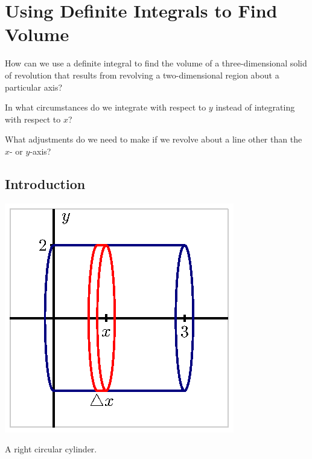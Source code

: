 \section{Using Definite Integrals to Find Volume} \label{S:6.1.Volume}

\begin{goals}
\item How can we use a definite integral to find the volume of a three-dimensional solid of revolution that results from revolving a two-dimensional region about a particular axis?
\item In what circumstances do we integrate with respect to $y$ instead of integrating with respect to $x$?
\item What adjustments do we need to make if we revolve about a line other than the $x$- or $y$-axis?
\end{goals}

\subsection*{Introduction}

\begin{marginfigure}[6cm] %
\includegraphics{figures/6_2_Intro.eps}
\caption{A right circular cylinder.} \label{F:6.1.Intro}
\end{marginfigure}

